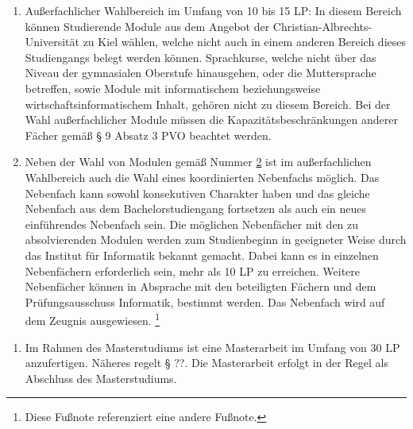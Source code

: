 \documentclass{article}\usepackage{helvet}\renewcommand{\familydefault}{\sfdefault}\usepackage[letterpaper,top=2cm,bottom=2cm,left=3cm,right=3cm,marginparwidth=1.75cm]{geometry}\usepackage[colorlinks=true,allcolors=red]{hyperref}\usepackage{enumitem}\usepackage{tabularx}\usepackage[T1]{fontenc}\usepackage[utf8]{inputenc}\usepackage{fancyhdr}\usepackage{lastpage}\pagestyle{fancy}\fancyhf{}
\begin{document}
\begin{enumerate}[start=2,label=(\arabic*)]
{\begin{enumerate}[label=\arabic*.]
{\begin{enumerate}[label=\alph*)]
			\end{enumerate}
Es müssen die folgenden Bedingungen bei den Modulen gemäß den Buchstaben \hyperlink{numb}{b} bis \hyperlink{nume}{e} eingehalten werden:
			\begin{enumerate}[label=\alph*)]
				\item{Ein oder zwei Masterseminare.}
				\item{Ein oder zwei Masterprojekte oder eine Projektgruppe.}
				\item{Höchstens ein Forschungsprojekt.}
				\item{Der Gesamtumfang der Module gemäß den Buchstaben \hyperlink{numb}{b} bis \hyperlink{nume}{e} ist höchstens 25 LP.}
			\end{enumerate}
}
			\item{\hypertarget{num2}{}Außerfachlicher Wahlbereich im Umfang von 10 bis 15 LP: In diesem Bereich können Studierende Module aus dem Angebot der Christian-Albrechts-Universität zu Kiel wählen, welche nicht auch in einem anderen Bereich dieses Studiengangs belegt werden können. Sprachkurse, welche nicht über das Niveau der gymnasialen Oberstufe hinausgehen, oder die Muttersprache betreffen, sowie Module mit informatischem beziehungsweise wirtschaftsinformatischem Inhalt, gehören nicht zu diesem Bereich. Bei der Wahl außerfachlicher Module müssen die Kapazitätsbeschränkungen anderer Fächer gemäß § 9 Absatz 3 PVO beachtet werden.}
			\item{Neben der Wahl von Modulen gemäß Nummer \hyperlink{num2}{2} ist im außerfachlichen Wahlbereich auch die Wahl eines koordinierten Nebenfachs möglich. Das Nebenfach kann sowohl konsekutiven Charakter haben und das gleiche Nebenfach aus dem Bachelorstudiengang fortsetzen als auch ein neues einführendes Nebenfach sein. Die möglichen Nebenfächer mit den zu absolvierenden Modulen werden zum Studienbeginn in geeigneter Weise durch das Institut für Informatik bekannt gemacht. Dabei kann es in einzelnen Nebenfächern erforderlich sein, mehr als 10 LP zu erreichen. Weitere Nebenfächer können in Absprache mit den beteiligten Fächern und dem Prüfungsausschuss Informatik, bestimmt werden. Das Nebenfach wird auf dem Zeugnis ausgewiesen. \footnote{\hypertarget{fn1}{}\label{fn1}Diese Fußnote referenziert eine andere Fußnote.}}
		\end{enumerate}
}
	\end{enumerate}

	\begin{enumerate}[start=3,label=(\arabic*)]
		\item{Im Rahmen des Masterstudiums ist eine Masterarbeit im Umfang von 30 LP anzufertigen. Näheres regelt § {\Large{??}}. Die Masterarbeit erfolgt in der Regel als Abschluss des Masterstudiums.}
	\end{enumerate}
\end{document}
